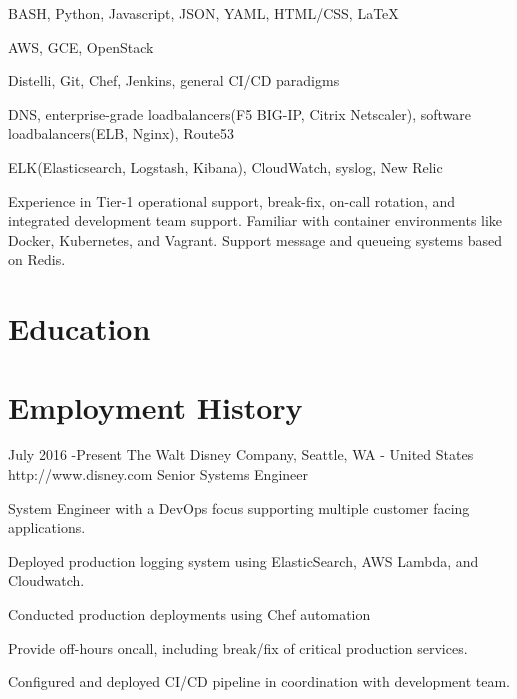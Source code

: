 \documentclass[10pt]{article} %
\begin{document}
{
BASH, Python, Javascript, JSON, YAML, HTML/CSS, LaTeX
}

{
AWS, GCE, OpenStack
}

{
Distelli, Git, Chef, Jenkins, general CI/CD paradigms
}

{
DNS, enterprise-grade loadbalancers(F5 BIG-IP, Citrix Netscaler), software loadbalancers(ELB, Nginx), Route53
}

{
ELK(Elasticsearch, Logstash, Kibana), CloudWatch, syslog, New Relic
}

{
Experience in Tier-1 operational support, break-fix, on-call rotation, and integrated development team support. Familiar with container environments like Docker, Kubernetes, and Vagrant. Support message and queueing systems based on Redis.
}

\section{Education}



\section{Employment History}

\job
{July 2016 -}{Present}
{The Walt Disney Company, Seattle, WA - United States}
{http://www.disney.com}
{Senior Systems Engineer}
{
\begin{itemize-noindent}
\item{System Engineer with a DevOps focus supporting multiple customer facing applications.}
\item{Deployed production logging system using ElasticSearch, AWS Lambda, and Cloudwatch.}
\item{Conducted production deployments using Chef automation}
\item{Provide off-hours oncall, including break/fix of critical production services.}
\item{Configured and deployed CI/CD pipeline in coordination with development team.}
\end{itemize-noindent}
}
\end{document}

